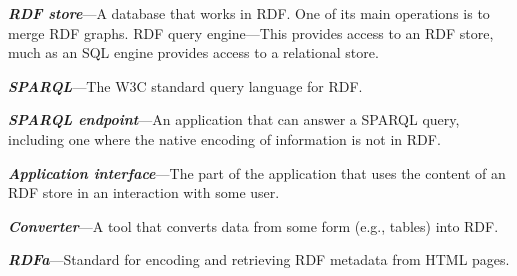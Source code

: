 \emph{\textbf{RDF store}}---A database that works in RDF. One of its main operations is
to merge RDF graphs. RDF query engine---This provides access to an RDF
store, much as an SQL engine provides access to a relational store.

\emph{\textbf{SPARQL}}---The W3C standard query language for RDF.

\emph{\textbf{SPARQL endpoint}}---An application that can answer a SPARQL query,
including one where the native encoding of information is not in RDF.

\emph{\textbf{Application interface}}---The part of the application that uses the
content of an RDF store in an interaction with some user.

\emph{\textbf{Converter}}---A tool that converts data from some form (e.g., tables) into
RDF.

\emph{\textbf{RDFa}}---Standard for encoding and retrieving RDF metadata from HTML
pages.
